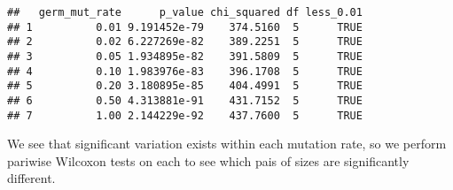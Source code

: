 \documentclass[]{book}
\newenvironment{Shaded}{\begin{snugshade}}{\end{snugshade}}
\newcommand{\ControlFlowTok}[1]{\textcolor[rgb]{0.13,0.29,0.53}{\textbf{#1}}}
\newcommand{\DataTypeTok}[1]{\textcolor[rgb]{0.13,0.29,0.53}{#1}}
\newcommand{\DecValTok}[1]{\textcolor[rgb]{0.00,0.00,0.81}{#1}}
\newcommand{\FloatTok}[1]{\textcolor[rgb]{0.00,0.00,0.81}{#1}}
\newcommand{\KeywordTok}[1]{\textcolor[rgb]{0.13,0.29,0.53}{\textbf{#1}}}
\newcommand{\NormalTok}[1]{#1}
\newcommand{\OperatorTok}[1]{\textcolor[rgb]{0.81,0.36,0.00}{\textbf{#1}}}
\newcommand{\StringTok}[1]{\textcolor[rgb]{0.31,0.60,0.02}{#1}}
\begin{document}
\begin{verbatim}
##   germ_mut_rate      p_value chi_squared df less_0.01
## 1          0.01 9.191452e-79    374.5160  5      TRUE
## 2          0.02 6.227269e-82    389.2251  5      TRUE
## 3          0.05 1.934895e-82    391.5809  5      TRUE
## 4          0.10 1.983976e-83    396.1708  5      TRUE
## 5          0.20 3.180895e-85    404.4991  5      TRUE
## 6          0.50 4.313881e-91    431.7152  5      TRUE
## 7          1.00 2.144229e-92    437.7600  5      TRUE
\end{verbatim}

We see that significant variation exists within each mutation rate, so we perform pariwise Wilcoxon tests on each to see which pais of sizes are significantly different.

\begin{Shaded}
\end{Shaded}
\end{document}
